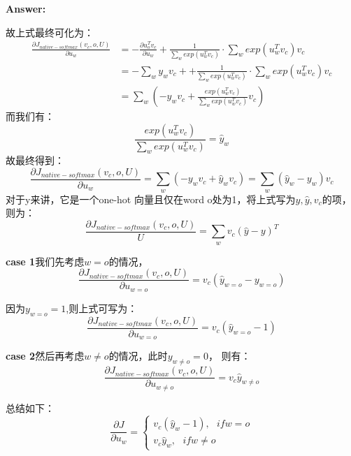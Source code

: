 \documentclass{article}
\newenvironment{answer}{
    {\bf Answer:} \sf \begingroup\color{red}
}{\endgroup}%
\begin{document}
\begin{enumerate}[label=(\alph*)]
\begin{shaded}
\begin{answer}
故上式最终可化为：
\begin{equation}
\begin{array}{cl}
	\frac{\partial J_{native-softmax}(v_c,o,U)}{\partial u_w} &= -\frac{\partial u_o^T v_c}{\partial u_w} +\frac{1}{\sum_w exp(u_w^T v_c)} \cdot \sum_w exp(u_w^T v_c) v_c\\
	&= -\sum_w y_w v_c+  + \frac{1}{\sum_w exp(u_w^T v_c)} \cdot \sum_w exp(u_w^T v_c) v_c \\
	&= \sum_w (-y_w v_c + \frac{exp(u_w^T v_c)}{\sum_w exp(u_w^T v_c)} v_c)
\end{array}
\end{equation}
而我们有：
\begin{equation}
	\frac{exp(u_w^T v_c)}{\sum_w exp(u_w^T v_c)} = \hat{y}_w
\end{equation}
故最终得到：
\begin{equation}
	\frac{\partial J_{native-softmax}(v_c,o,U)}{\partial u_w} = \sum_w (-y_w v_c +\hat{y}_w v_c) = \sum_w(\hat{y}_w - y_w)v_c
\end{equation}
对于y来讲，它是一个one-hot 向量且仅在word o处为1，将上式写为$y,\hat{y},v_c$的项，则为：
\begin{equation}
	\frac{\partial J_{native-softmax}(v_c,o,U)}{U} =  \sum_w v_c(\hat{y} - y)^T
\end{equation}

\textbf{case 1}我们先考虑$w=o$的情况，
\begin{equation}
	\frac{\partial J_{native-softmax}(v_c,o,U)}{\partial u_{w=o}} = v_c (\hat{y}_{w=o} - y_{w=o})
\end{equation}

因为$y_{w=o}=1$,则上式可写为：
\begin{equation}
	\frac{\partial J_{native-softmax}(v_c,o,U)}{\partial u_{w=o}} = v_c (\hat{y}_{w=o} - 1)
\end{equation}

\textbf{case 2}然后再考虑$w\neq o$的情况，此时$y_{w\neq o}=0$，
则有：
\begin{equation}
		\frac{\partial J_{native-softmax}(v_c,o,U)}{\partial u_{w\neq o}} = v_c \hat{y}_{w\neq o}
\end{equation}

总结如下：
\begin{equation}
	\frac{\partial J}{\partial u_w} = \left\{
	\begin{array}{l}
		v_c (\hat{y}_{w} - 1),\ \ \ if w=o \\
		v_c \hat{y}_{w}, \ \ \ if w\neq o
	\end{array}
	\right.
\end{equation}
\end{answer}
\end{shaded}


\end{enumerate}
\end{document}

